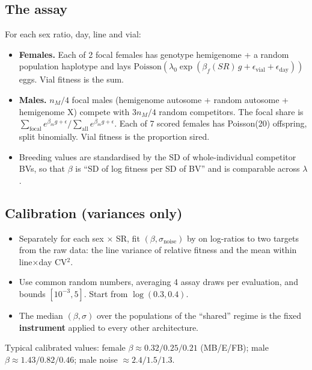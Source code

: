 \subsection{The assay}
For each sex ratio, day, line and vial:
\begin{itemize}
\item \textbf{Females.} Each of 2 focal females has genotype hemigenome + a random population haplotype and lays $\mathrm{Poisson}(\lambda_0\exp(\beta_f(SR)\,g+\epsilon_\mathrm{vial}+\epsilon_\mathrm{day}))$ eggs. Vial fitness is the sum.
\item \textbf{Males.} $n_M/4$ focal males (hemigenome autosome + random autosome + hemigenome X) compete with $3n_M/4$ random competitors. The focal share is $\sum_\mathrm{focal}e^{\beta_m g+\epsilon}/\sum_\mathrm{all}e^{\beta_m g+\epsilon}$. Each of 7 scored females has Poisson(20) offspring, split binomially. Vial fitness is the proportion sired.
\item Breeding values are standardised by the SD of whole-individual competitor BVs, so that $\beta$ is ``SD of log fitness per SD of BV'' and is comparable across $\lambda$.
\end{itemize}

\subsection{Calibration (variances only)}
\begin{itemize}
\item Separately for each sex $\times$ SR, fit $(\beta,\sigma_\mathrm{noise})$ by  on log-ratios to two targets from the raw data: the line variance of relative fitness and the mean within line$\times$day CV$^2$.
\item Use common random numbers, averaging 4 assay draws per evaluation, and bounds $[10^{-3},5]$. Start from $\log(0.3,0.4)$.
\item The median $(\beta,\sigma)$ over the populations of the ``shared'' regime is the fixed \textbf{instrument} applied to every other architecture.
\end{itemize}
Typical calibrated values: female $\beta\approx0.32/0.25/0.21$ (MB/E/FB); male $\beta\approx1.43/0.82/0.46$; male noise $\approx2.4/1.5/1.3$.

